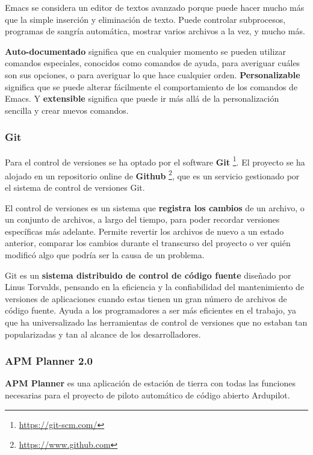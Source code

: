 Emacs se considera un editor de textos avanzado porque puede hacer mucho más que la simple inserción y eliminación de texto. Puede controlar subprocesos, programas de sangría automática, mostrar varios archivos a la vez, y mucho más. 

\textbf{Auto-documentado} significa que en cualquier momento se pueden utilizar comandos especiales, conocidos como comandos de ayuda, para averiguar cuáles son sus opciones, o para averiguar lo que hace cualquier orden. \textbf{Personalizable} significa que se puede alterar fácilmente el comportamiento de los comandos de Emacs. Y \textbf{extensible} significa que puede ir más allá de la personalización sencilla y crear nuevos comandos.

\subsubsection{Git}
\label{sec:git}

Para el control de versiones se ha optado por el software \textbf{Git} \footnote{\url{https://git-scm.com/}}. El proyecto se ha alojado en un repositorio online de \textbf{Github} \footnote{\url{https://www.github.com}}, que es un servicio gestionado por el sistema de control de versiones Git.

El control de versiones es un sistema que \textbf{registra los cambios} de un archivo, o un conjunto de archivos, a largo del tiempo, para poder recordar versiones específicas más adelante. Permite revertir los archivos de nuevo a un estado anterior, comparar los cambios durante el transcurso del proyecto o ver quién modificó algo que podría ser la causa de un problema.

Git es un \textbf{sistema distribuido de control de código fuente} diseñado por Linus Torvalds, pensando en la eficiencia y la confiabilidad del mantenimiento de versiones de aplicaciones cuando estas tienen un gran número de archivos de código fuente. Ayuda a los programadores a ser más eficientes en el trabajo, ya que ha universalizado las herramientas de control de versiones que no estaban tan popularizadas y tan al alcance de los desarrolladores.

\subsubsection{APM Planner 2.0}
\label{sec:planner}

\textbf{APM Planner} es una aplicación de estación de tierra con todas las funciones necesarias para el proyecto de piloto automático de código abierto Ardupilot.

